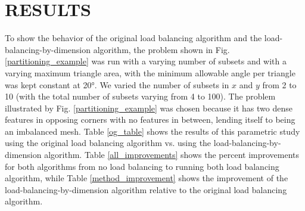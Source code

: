 \section{RESULTS}

To show the behavior of the original load balancing algorithm and the load-balancing-by-dimension algorithm, the problem shown in Fig. \ref{partitioning_example} was run with a varying number of subsets and with a varying maximum triangle area, with the minimum allowable angle per triangle was kept constant at \ang{20}. We varied the number of subsets in $x$ and $y$ from 2 to 10 (with the total number of subsets varying from 4 to 100). The problem illustrated by Fig. \ref{partitioning_example} was chosen because it has two dense features in opposing corners with no features in between, lending itself to being an imbalanced mesh. Table \ref{og_table} shows the results of this parametric study using the original load balancing algorithm vs. using the load-balancing-by-dimension algorithm. Table \ref{all_improvements} shows the percent improvements for both algorithms from no load balancing to running both load balancing algorithm, while Table \ref{method_improvement} shows the improvement of the load-balancing-by-dimension algorithm relative to the original load balancing algorithm.

